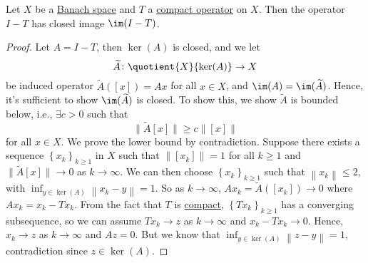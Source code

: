 \begin{lemma}\label{lma:lec19}
	Let \(X\) be a \hyperref[def:Banach-space]{Banach space} and \(T\) a \hyperref[def:compact-op]{compact operator} on \(X\). Then the operator \(I-T\) has closed image \(\im(I-T)\).
\end{lemma}
\begin{proof}
	Let \(A=I-T\), then \(\ker (A)\) is closed, and we let
	\[
		\widetilde{A} \colon \quotient{X}{\ker(A)}\to X
	\]
	be induced operator \(\widetilde{A} ([x])=Ax\) for all \(x\in X\), and \(\im(A) = \im(\widetilde{A} )\). Hence, it's sufficient to show \(\im(\widetilde{A} )\) is closed. To show this, we show \(\widetilde{A} \) is bounded below, i.e., \(\exists c>0\) such that
	\[
		\lVert \widetilde{A} [x]\rVert \geq c\left\lVert [x]\right\rVert
	\]
	for all \(x\in X\). We prove the lower bound by contradiction. Suppose there exists a sequence \(\left\{ x_k \right\} _{k\geq 1}\) in \(X\) such that \(\left\lVert [x_{k} ]\right\rVert = 1\) for all \(k\geq 1\) and \(\lVert \widetilde{A} [x] \rVert \to 0\) as \(k \to \infty \). We can then choose \(\left\{ x_{k}  \right\}_{k\geq 1} \) such that \(\left\lVert x_{k} \right\rVert \leq 2\), with \(\inf_{y\in \ker(A)} \left\lVert x_{k} -y\right\rVert=1 \). So as \(k\to \infty \), \(Ax_{k} = \widetilde{A} ([x_{k} ])\to 0\) where \(Ax_{k} = x_{k} - Tx_{k} \). From the fact that \(T\) is \hyperref[def:compact-op]{compact}, \(\left\{ Tx_{k}  \right\}_{k\geq 1} \) has a converging subsequence, so we can assume \(Tx_{k} \to z\) as \(k\to \infty \) and \(x_{k} - Tx_{k} \to 0\). Hence, \(x_{k} \to z\) as \(k\to  \infty \) and \(Az = 0\). But we know that \(\inf _{y\in \ker(A)} \left\lVert z - y\right\rVert = 1\), contradiction since \(z\in \ker(A)\).
\end{proof}

